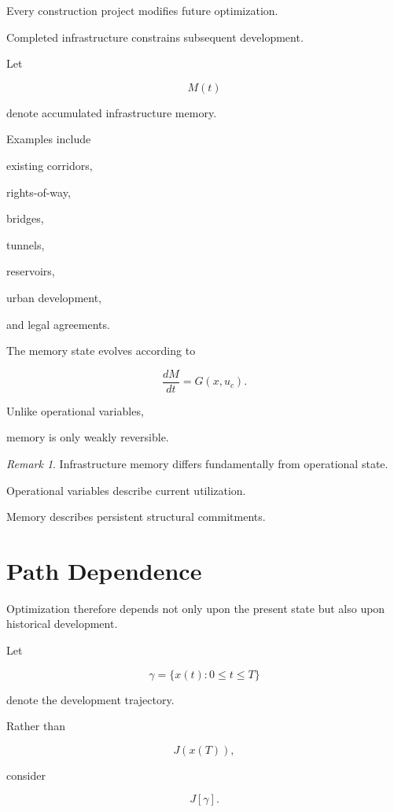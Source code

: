 \documentclass[11pt,fleqn]{book}
\numberwithin{equation}{chapter}
\theoremstyle{plain}
\theoremstyle{definition}
\theoremstyle{remark}
\newtheorem{remark}[theorem]{Remark}
\begin{document}
Every construction project modifies future optimization.

Completed infrastructure constrains subsequent development.

Let

\[
M(t)
\]

denote accumulated infrastructure memory.

Examples include

existing corridors,

rights-of-way,

bridges,

tunnels,

reservoirs,

urban development,

and legal agreements.

The memory state evolves according to

\[
\boxed{
\frac{dM}{dt}
=
G(x,u_c).
}
\]

Unlike operational variables,

memory is only weakly reversible.


\begin{remark}

Infrastructure memory differs fundamentally from operational state.

Operational variables describe current utilization.

Memory describes persistent structural commitments.

\end{remark}


\section{Path Dependence}

Optimization therefore depends not only upon the present state but also
upon historical development.

Let

\[
\gamma
=
\{
x(t):
0\le t\le T
\}
\]

denote the development trajectory.

Rather than

\[
J(x(T)),
\]

consider

\[
\boxed{
J[\gamma].
}
\]
\end{document}
